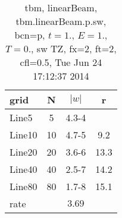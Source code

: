 \begin{table}[hbt]\tableFont %
\begin{center}
\begin{tabular}{|l|c|c|c|} \hline 
grid  & N &  $\vert w \vert$   & r \\ \hline 
               Line5 &     5 & \num{4.3}{-4} &       \\ \hline
              Line10 &    10 & \num{4.7}{-5} &  9.2  \\ \hline
              Line20 &    20 & \num{3.6}{-6} & 13.3  \\ \hline
              Line40 &    40 & \num{2.5}{-7} & 14.2  \\ \hline
              Line80 &    80 & \num{1.7}{-8} & 15.1  \\ \hline
    rate             &       &  $3.69$       &       \\ \hline
\end{tabular}
\caption{tbm, linearBeam, tbm.linearBeam.p.sw, bcn=p, $ t=1.$, $ E=1.$, $ T=0.$,  sw TZ, fx=2, ft=2, cfl=0.5, Tue Jun 24 17:12:37 2014}\label{table:tbm.linearBeam.p.sw}
\end{center}
\end{table}
